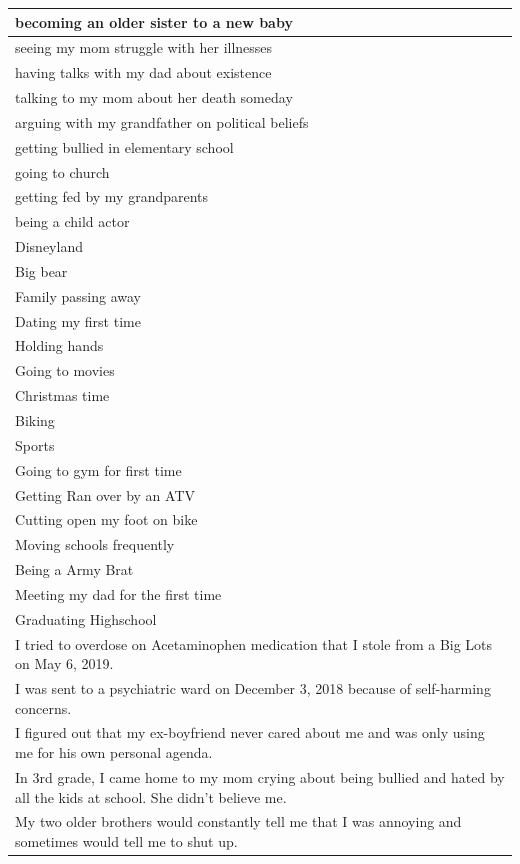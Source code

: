 \documentclass[
  .7em,
  letterpaper,
  DIV=11,
  numbers=noendperiod]{scrartcl}
\begin{document}
\begin{table}
\begin{tabular}{l}
\hline
becoming an older sister to a new baby\\
\hline
seeing my mom struggle with her illnesses\\
\hline
having talks with my dad about existence\\
\hline
talking to my mom about her death someday\\
\hline
arguing with my grandfather on political beliefs\\
\hline
getting bullied in elementary school\\
\hline
going to church\\
\hline
getting fed by my grandparents\\
\hline
being a child actor\\
\hline
Disneyland\\
\hline
Big bear\\
\hline
Family passing away\\
\hline
Dating my first time\\
\hline
Holding hands\\
\hline
Going to movies\\
\hline
Christmas time\\
\hline
Biking\\
\hline
Sports\\
\hline
Going to gym for first time\\
\hline
Getting Ran over by an ATV\\
\hline
Cutting open my foot on bike\\
\hline
Moving schools frequently\\
\hline
Being a Army Brat\\
\hline
Meeting my dad for the first time\\
\hline
Graduating Highschool\\
\hline
I tried to overdose on Acetaminophen medication that I stole from a Big Lots on May 6, 2019.\\
\hline
I was sent to a psychiatric ward on December 3, 2018 because of self-harming concerns.\\
\hline
I figured out that my ex-boyfriend never cared about me and was only using me for his own personal agenda.\\
\hline
In 3rd grade, I came home to my mom crying about being bullied and hated by all the kids at school. She didn't believe me.\\
\hline
My two older brothers would constantly tell me that I was annoying and sometimes would tell me to shut up.\\

\end{tabular}
\end{table}
\end{document}
